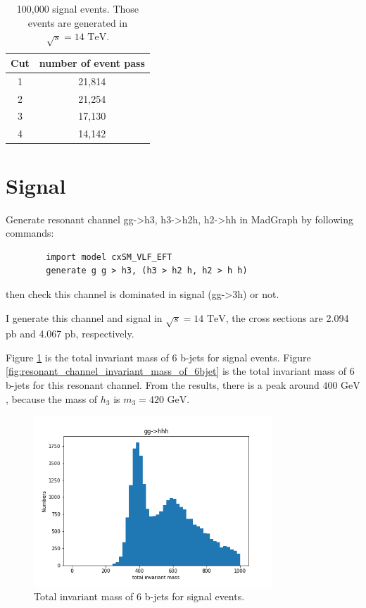 \documentclass[12pt]{article}
\begin{document}
	\begin{table}[htpb]
		\centering
		\caption{100,000 signal events. Those events are generated in $\sqrt{s} = 14 \text{ TeV}$.}
		\label{tab:cutflow_table_signal_bjet}
		\begin{tabular}{cc}
			Cut & number of event pass \\
			\hline
			1 & 21,814 \\
			2 & 21,254 \\
			3 & 17,130 \\
			4 & 14,142 
		\end{tabular}	
	\end{table}

\section{Signal}%
\label{sec:signal}
	Generate resonant channel gg->h3, h3->h2h, h2->hh in MadGraph by following commands:
	\begin{verbatim}
		import model cxSM_VLF_EFT
		generate g g > h3, (h3 > h2 h, h2 > h h)
	\end{verbatim}
	then check this channel is dominated in signal (gg->3h) or not.

	I generate this channel and signal in $\sqrt{s} = \text{14 TeV}$, the cross sections are 2.094 pb and 4.067 pb, respectively.

	Figure \ref{fig:signal_invariant_mass_of_6bjet} is the total invariant mass of 6 b-jets for signal events. Figure \ref{fig:resonant_channel_invariant_mass_of_6bjet} is the total invariant mass of 6 b-jets for this resonant channel. From the results, there is a peak around $\text{400 GeV}$, because the mass of $h_3$ is $m_3 = \text{420 GeV}$.

	\begin{figure}[htpb]
		\centering
		\includegraphics[width=0.8\textwidth]{signal_6_b-jets_total_invariant_mass.png}
		\caption{Total invariant mass of 6 b-jets for signal events.}
		\label{fig:signal_invariant_mass_of_6bjet}
	\end{figure}
\end{document}
